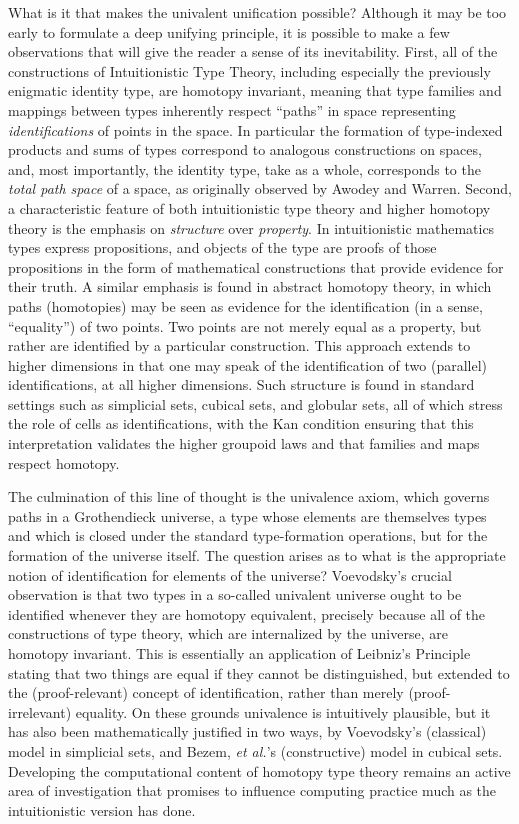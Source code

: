 \documentclass[11pt]{article}
\theoremstyle{remark}
\theoremstyle{definition}
\begin{document}
What is it that makes the univalent unification possible?  Although it may be too early to formulate a deep unifying
principle, it is possible to make a few observations that will give the reader a sense of its inevitability.  First, all
of the constructions of Intuitionistic Type Theory, including especially the previously enigmatic identity type, are
homotopy invariant, meaning that type families and mappings between types inherently respect ``paths'' in space
representing \emph{identifications} of points in the space.  In particular the formation of type-indexed products and
sums of types correspond to analogous constructions on spaces, and, most importantly, the identity type, take as a
whole, corresponds to the \emph{total path space} of a space, as originally observed by Awodey and Warren.  Second, a
characteristic feature of both intuitionistic type theory and higher homotopy theory is the emphasis on \emph{structure}
over \emph{property}.  In intuitionistic mathematics types express propositions, and objects of the type are proofs of
those propositions in the form of mathematical constructions that provide evidence for their truth.  A similar emphasis
is found in abstract homotopy theory, in which paths (homotopies) may be seen as evidence for the identification (in a
sense, ``equality'') of two points.  Two points are not merely equal as a property, but rather are identified by a
particular construction.  This approach extends to higher dimensions in that one may speak of the identification of two
(parallel) identifications, at all higher dimensions.  Such structure is found in standard settings such as simplicial
sets, cubical sets, and globular sets, all of which stress the role of cells as identifications, with the Kan condition
ensuring that this interpretation validates the higher groupoid laws and that families and maps respect homotopy.

The culmination of this line of thought is the univalence axiom, which governs paths in a Grothendieck universe, a type
whose elements are themselves types and which is closed under the standard type-formation operations, but for the
formation of the universe itself.  The question arises as to what is the appropriate notion of identification for
elements of the universe?  Voevodsky's crucial observation is that two types in a so-called univalent universe ought to
be identified whenever they are homotopy equivalent, precisely because all of the constructions of type theory, which
are internalized by the universe, are homotopy invariant.  This is essentially an application of Leibniz's Principle
stating that two things are equal if they cannot be distinguished, but extended to the (proof-relevant) concept of
identification, rather than merely (proof-irrelevant) equality.  On these grounds univalence is intuitively plausible,
but it has also been mathematically justified in two ways, by Voevodsky's (classical) model in simplicial sets, and
Bezem, \textit{et al.}'s (constructive) model in cubical sets.  Developing the computational content of homotopy type
theory remains an active area of investigation that promises to influence computing practice much as the intuitionistic
version has done.
\end{document}
